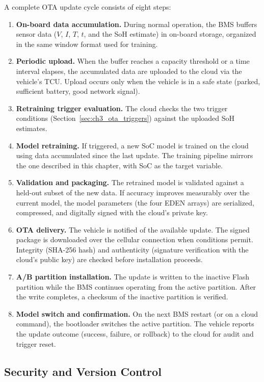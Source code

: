 A complete OTA update cycle consists of eight steps:

\begin{enumerate}
    \item \textbf{On-board data accumulation.} During normal operation, the BMS buffers sensor data ($V$, $I$, $T$, $t$, and the SoH estimate) in on-board storage, organized in the same window format used for training.
    \item \textbf{Periodic upload.} When the buffer reaches a capacity threshold or a time interval elapses, the accumulated data are uploaded to the cloud via the vehicle's \gls{TCU}. Upload occurs only when the vehicle is in a safe state (parked, sufficient battery, good network signal).
    \item \textbf{Retraining trigger evaluation.} The cloud checks the two trigger conditions (Section~\ref{sec:ch3_ota_triggers}) against the uploaded SoH estimates.
    \item \textbf{Model retraining.} If triggered, a new SoC model is trained on the cloud using data accumulated since the last update. The training pipeline mirrors the one described in this chapter, with SoC as the target variable.
    \item \textbf{Validation and packaging.} The retrained model is validated against a held-out subset of the new data. If accuracy improves measurably over the current model, the model parameters (the four EDEN arrays) are serialized, compressed, and digitally signed with the cloud's private key.
    \item \textbf{OTA delivery.} The vehicle is notified of the available update. The signed package is downloaded over the cellular connection when conditions permit. Integrity (SHA-256 hash) and authenticity (signature verification with the cloud's public key) are checked before installation proceeds.
    \item \textbf{A/B partition installation.} The update is written to the inactive Flash partition while the BMS continues operating from the active partition. After the write completes, a checksum of the inactive partition is verified.
    \item \textbf{Model switch and confirmation.} On the next BMS restart (or on a cloud command), the bootloader switches the active partition. The vehicle reports the update outcome (success, failure, or rollback) to the cloud for audit and trigger reset.
\end{enumerate}

\subsection{Security and Version Control}

